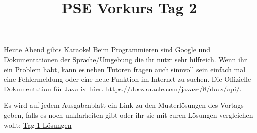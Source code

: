 \documentclass{../../sheet}
\title{PSE Vorkurs Tag 2}
\begin{document}
\maketitle
Heute Abend gibts Karaoke!
Beim Programmieren sind Google und Dokumentationen der Sprache/Umgebung die ihr nutzt sehr hilfreich. Wenn ihr ein Problem habt, kann es neben Tutoren fragen auch sinnvoll sein einfach mal eine Fehlermeldung oder eine neue Funktion im Internet zu suchen. Die Offizielle Dokumentation für Java ist hier: \url{https://docs.oracle.com/javase/8/docs/api/}.

Es wird auf jedem Ausgabenblatt ein Link zu den Musterlösungen des Vortags geben, falls es noch unklarheiten gibt oder ihr sie mit euren Lösungen vergleichen wollt: \href{https://fius.de/wp-content/uploads/2025/10/Day1Musterloesung.zip}{Tag 1 Lösungen}
\end{document}
